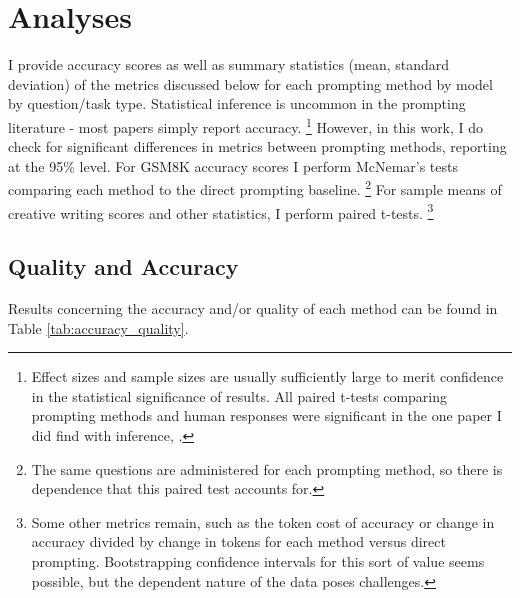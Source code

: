 \documentclass[11pt]{article}
\begin{document}
\section*{Analyses}

I provide accuracy scores as well as summary statistics (mean, standard deviation) of the metrics discussed below for each prompting method by model by question/task type. Statistical inference is uncommon in the prompting literature - most papers simply report accuracy. \footnote{Effect sizes and sample sizes are usually sufficiently large to merit confidence in the statistical significance of results. All paired t-tests comparing prompting methods and human responses were significant in the one paper I did find with inference, \citealp{pu_chatgpt_2023}.} However, in this work, I do check for significant differences in metrics between prompting methods, reporting at the 95\% level. For GSM8K accuracy scores I perform McNemar's tests comparing each method to the direct prompting baseline. \footnote{The same questions are administered for each prompting method, so there is dependence that this paired test accounts for.} For sample means of creative writing scores and other statistics, I perform paired t-tests. \footnote{Some other metrics remain, such as the token cost of accuracy or change in accuracy divided by change in tokens for each method versus direct prompting. Bootstrapping confidence intervals for this sort of value seems possible, but the dependent nature of the data poses challenges.}

\subsection*{Quality and Accuracy}

Results concerning the accuracy and/or quality of each method can be found in Table \ref{tab:accuracy_quality}.
\end{document}

